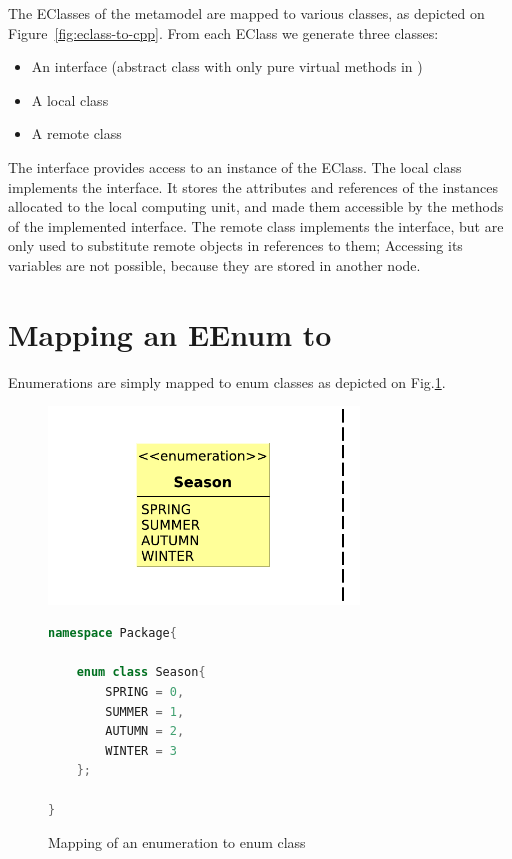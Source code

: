 The EClasses of the metamodel are mapped to various \cpp{} classes, as depicted on \mbox{Figure~\ref{fig:eclass-to-cpp}}.
From each EClass we generate three \cpp{} classes:

\begin{itemize}
	\item An interface (abstract class with only pure virtual methods in \cpp{})
	\item A local class
	\item A remote class
\end{itemize}


The interface provides access to an instance of the EClass.
The local class implements the interface. It stores the attributes and references of the instances allocated to the local computing unit, and made them accessible by the methods of the implemented interface.
The remote class implements the interface, but are only used to substitute remote objects in references to them; 
Accessing its variables are not possible, because they are stored in another node. 

\section{Mapping an EEnum to \protect\cpp }

Enumerations are simply mapped to \cpp{} enum classes as depicted on Fig.\ref{fig:eenum-to-cpp}.

\begin{figure}[H]
	\begin{center}
		
		\begin{minipage}[c]{\textwidth}
		\begin{minipage}[r]{0.52\textwidth}
			\hfill
			\includegraphics[width=0.735\textwidth]{figures/eenum-to-cpp.pdf}
		\end{minipage}
			\hspace{0.05\textwidth}
		\begin{minipage}[c]{0.25\textwidth}
\begin{lstlisting}[language=C++]
namespace Package{
	
	enum class Season{
		SPRING = 0,
		SUMMER = 1,
		AUTUMN = 2,
		WINTER = 3
	};

}
\end{lstlisting}			
		\end{minipage}
		\end{minipage}
		\caption{Mapping of an enumeration to \protect\cpp{} enum class }
		\label{fig:eenum-to-cpp}
	\end{center}
\end{figure}


